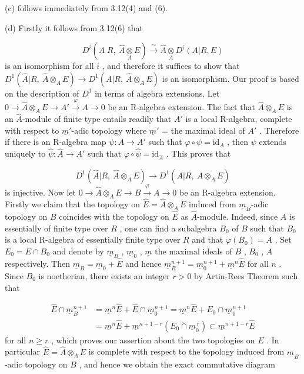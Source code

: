 (c)  follows immediately from 3.12(4) and (6).

(d)  Firstly it follows from 3.12(6) that

\begin{equation*}
D^i(A\;R, \ \hat{A}\underset{A}{\otimes}E) \xrightarrow{\ \sim\ } \hat{A}\underset{A}{\otimes}D^i(A|R, E)
\end{equation*}
is an isomorphism for all  $i$  , and therefore it suffices to show that
$D^1(\hat{A}|R,\ \hat{A}\otimes_A E) \to D^1(A|R,\ \hat{A}\otimes_A E)$  is an isomorphism. Our proof is based on the description of  $D^1$  in terms of algebra extensions. Let  $0 \to \hat{A}\otimes_A E \to A' \xrightarrow{\ \varphi\ } A \to 0$  be an R-algebra extension. The fact that  $\hat{A}\otimes_A E$  is an $\hat{A}$-module of finite type entails readily that  $A'$  is a local R-algebra, complete with respect to $\underline{m}'$-adic topology where  $\underline{m}'$ = the maximal ideal of  $A'$ . Therefore if there is an R-algebra map  $\psi : A \to A'$  such that  $\varphi \circ \psi = \mathrm{id}_A$ , then  $\psi$  extends uniquely to  $\hat{\psi} : \hat{A} \to A'$  such that  $\varphi \circ \hat{\psi} = \mathrm{id}_{\hat{A}}$ . This proves that

\begin{equation*}
D^1(\hat{A}|R,\ \hat{A}\otimes_A E) \to D^1(A|R,\ \hat{A}\otimes_A E)
\end{equation*}
is injective. Now let  $0 \to \hat{A}\otimes_A E \to B \xrightarrow{\ \varphi\ } A \to 0$  be an R-algebra extension. Firstly we claim that the topology on  $\hat{E} = \hat{A}\otimes_A E$  induced from  $\underline{m}_B$-adic topology on  $B$  coincides with the topology on  $\hat{E}$  as $\hat{A}$-module. Indeed, since  $A$  is essentially of finite type over  $R$ , one can find a subalgebra  $B_0$  of  $B$  such that  $B_0$  is a local R-algebra of essentially finite type over  $R$  and that  $\varphi(B_0) = A$ . Set  $E_0 = E \cap B_0$  and denote by  $\underline{m}_B$ , $\underline{m}_0$ , $\underline{m}$  the maximal ideals of  $B$ , $B_0$ , $A$  respectively. Then  $\underline{m}_B = \underline{m}_0 + \hat{E}$  and hence  $\underline{m}_B^{n+1} = \underline{m}_0^{n+1} + \underline{m}^n\hat{E}$  for all  $n$ . Since  $B_0$  is noetherian, there exists an integer  $r > 0$  by Artin-Rees Theorem such that

\begin{equation*}
\begin{aligned}
\hat{E} \cap \underline{m}_B^{n+1} &= \underline{m}^n\hat{E} + \hat{E} \cap \underline{m}_0^{n+1} = \underline{m}^n\hat{E} + E_0 \cap \underline{m}_0^{n+1}\\
&= \underline{m}^n\hat{E} + \underline{m}^{n+1-r}(E_0 \cap \underline{m}_0^{\,r}) \subset \underline{m}^{n+1-r}\hat{E}
\end{aligned}
\end{equation*}
for all  $n \geq r$ , which proves our assertion about the two topologies on  $E$  . In particular  $\hat{E} = \hat{A}\otimes_A E$  is complete with respect to the topology induced from $\underline{m}_B$-adic topology on  $B$ , and hence we obtain the exact commutative diagram

